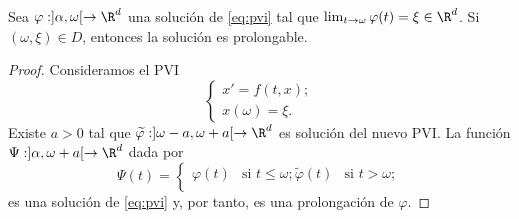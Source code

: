 \documentclass{article}
\begin{document}
\begin{lemma}
  Sea $\varphi : ]\alpha, \omega[ \to \R^d$ una solución de \eqref{eq:pvi} tal que
  $\lim_{t \to \omega} \varphi(t) = \xi \in \R^d$. Si $(\omega, \xi) \in D$, entonces la solución es
  prolongable.
\end{lemma}
\begin{proof}
  Consideramos el PVI
  \[\begin{cases}x' = f(t, x); \\ x(\omega) = \xi. \end{cases}\]
  Existe $a > 0$ tal que $\widetilde{\varphi}: ]\omega-a, \omega+a[ \to \R^d$ es solución del nuevo
  PVI. La función $\Psi: ]\alpha, \omega+a[ \to \R^d$ dada por
  \[\Psi(t) = \begin{cases} \varphi(t) & \text{si } t \le \omega; \widetilde{\varphi}(t) & \text{si
      } t > \omega;\\\end{cases}\] es una solución de \eqref{eq:pvi} y, por tanto, es una
  prolongación de $\varphi$.
\end{proof}
\end{document}
